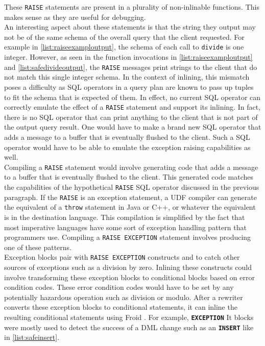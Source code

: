\documentclass[12pt]{cmuthesis}
\newcommand{\dbSQL}[1]{\texttt{\textbf{#1}}\xspace}
\begin{document}
These \texttt{RAISE} statements are present in a plurality of non-inlinable functions. This makes sense as they are useful for debugging.\\

An interesting aspect about these statements is that the string they output may not be of the same schema of the overall query that the client requested. For example in \cref{list:raiseexamploutput}, the schema of each call to \texttt{divide} is one integer. However, as seen in the function invocations in \cref{list:raiseexamploutput} and \cref{list:safedivideoutput}, the \texttt{RAISE} messages print strings to the client that do not match this single integer schema. In the context of inlining, this mismatch poses a difficulty as SQL operators in a query plan are known to pass up tuples to fit the schema that is expected of them. In effect, no current SQL operator can correctly emulate the effect of a \texttt{RAISE} statement and support its inlining. In fact, there is no SQL operator that can print anything to the client that is not part of the output query result. One would have to make a brand new SQL operator that adds a message to a buffer that is eventually flushed to the client. Such a SQL operator would have to be able to emulate the exception raising capabilities as well.\\

Compiling a \texttt{RAISE} statement would involve generating code that adds a message to a buffer that is eventually flushed to the client. This generated code matches the capabilities of the hypothetical \texttt{RAISE} SQL operator discussed in the previous paragraph. If the \texttt{RAISE} is an exception statement, a UDF compiler can generate the equivalent of a \texttt{throw} statement in Java or C++, or whatever the equivalent is in the destination language. This compilation is simplified by the fact that most imperative languages have some sort of exception handling pattern that programmers use. Compiling a \texttt{RAISE EXCEPTION} statement involves producing one of these patterns.\\

Exception blocks pair with \texttt{RAISE EXCEPTION} constructs and to catch other sources of exceptions such as a division by zero. Inlining these constructs could involve transforming these exception blocks to conditional blocks based on error condition codes. These error condition codes would have to be set by any potentially hazardous operation such as division or modulo. After a rewriter converts these exception blocks to conditional statements, it can inline the resulting conditional statements using Froid \cite{ramachandra19}. For example,
\dbSQL{EXCEPTION}It blocks were mostly used to detect the success of a DML change such as an \dbSQL{INSERT} like in \cref{list:safeinsert}.
\end{document}
